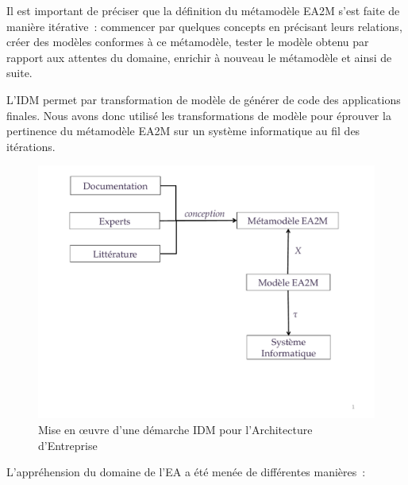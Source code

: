     Il est important de préciser que la définition du métamodèle EA2M s'est faite de manière
    itérative~: commencer par quelques concepts en précisant leurs relations,
    créer des modèles conformes à ce métamodèle, tester le modèle obtenu par rapport
    aux attentes du domaine, enrichir à nouveau le métamodèle et ainsi de suite.

    L'IDM permet par transformation de modèle de générer de code des applications
    finales. Nous avons donc utilisé les transformations de modèle pour éprouver la pertinence du métamodèle
    EA2M sur un système informatique au fil des itérations.


    \begin{figure}[!ht]

         \begin{center}

        \includegraphics[trim=0cm 4cm 0cm 0cm, width=1\textwidth]{figures/4_demarche/demarche_idm.pdf}

         \end{center}

         \caption{Mise en œuvre d'une démarche IDM pour l'Architecture
         d'Entreprise}

         \label{fig:demarche_idem}

    \end{figure}

    L'appréhension du domaine de l'EA a été menée de différentes manières~: 

